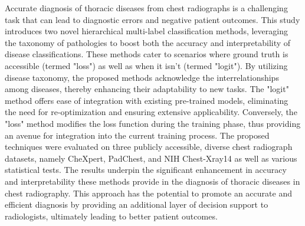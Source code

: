 Accurate diagnosis of thoracic diseases from chest radiographs is a challenging task that can lead to diagnostic errors and negative patient outcomes. This study introduces two novel hierarchical multi-label classification methods, leveraging the taxonomy of pathologies to boost both the accuracy and interpretability of disease classifications. These methods cater to scenarios where ground truth is accessible (termed "loss") as well as when it isn't (termed "logit"). By utilizing disease taxonomy, the proposed methods acknowledge the interrelationships among diseases, thereby enhancing their adaptability to new tasks. The "logit" method offers ease of integration with existing pre-trained models, eliminating the need for re-optimization and ensuring extensive applicability. Conversely, the "loss" method modifies the loss function during the training phase, thus providing an avenue for integration into the current training process. The proposed techniques were evaluated on three publicly accessible, diverse chest radiograph datasets, namely CheXpert, PadChest, and NIH Chest-Xray14 as well as various statistical tests. The results underpin the significant enhancement in accuracy and interpretability these methods provide in the diagnosis of thoracic diseases in chest radiography. This approach has the potential to promote an accurate and efficient diagnosis by providing an additional layer of decision support to radiologists, ultimately leading to better patient outcomes.







